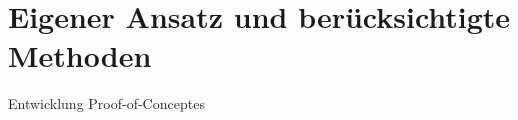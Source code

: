\documentclass[10pt,a4paper,twocolumn,conference]{IEEEtran}
\begin{document}
\begin{comment}
\section{Theoretischer Rahmen}
Hier sollen theoretische Annahmen und Konzepte kurz eingeführt und erklärt
werden. Aus bibliothekarischer Perspektive werden in einem Teil wichtige
Konzepte wie das Semantic Web und dessen Technologien erklärt.\cite{RN8}  Stichpunkte und
Fragen für diesen \textit{Theorie-I-Teil} sind:\\
Semantic Web, FRBR, LRM, RDF, LOD, Warum sind Metadaten von
Bibliotheksbeständen besonders für Visualisierungen geeignet? Catalogue
Enrichment.Für den zweiten Theorieteil werden Schlaglichter auf Data
Science, Digital Humanities geworfen. Dabei spielen auch die verwendeten
Technologien eine Rolle. Stichpunkte sind für diesen \textit{Theorie-II-Teil:}\\
Visualisierungen, Grenzen und Möglichkeiten, Interaktive Grafiken,
Data Science Life Cycle
Kapitel in den \textit{Theorie-III-Teil} zusammen und diskutiert anhand 
von Literatur aus der bibliothekarischen Praxis bereits vorhandene Beispiele. 
Dabei wird hierbei auch die Frage der technischen Umsetzung eine Rolle spielen,
aber auch auf insbesondere eventuelle erstellen hingewiesen \cite{RN9, RN3}.
RVK-Visual \url{https://github.com/bvb-kobv-allianz/RVK-VISUAL}
\end{comment}
\section{Eigener Ansatz und berücksichtigte Methoden}
Entwicklung Proof-of-Conceptes
\end{document}

